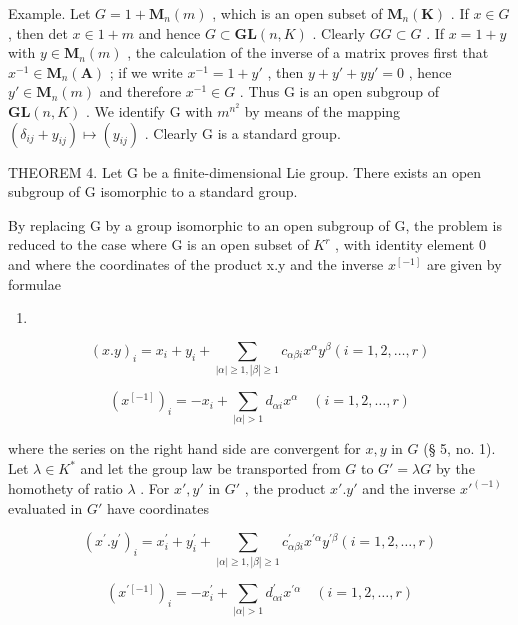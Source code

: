 Example. Let \(G = 1 + \mathbf{M}_{n}(m)\) , which is an open subset of \(\mathbf{M}_{n}(\mathbf{K})\) . If \(x \in G\) , then det \(x \in 1 + m\) and hence \(G \subset \mathbf{GL}(n, K)\) . Clearly \(GG \subset G\) . If \(x = 1 + y\) with \(y \in \mathbf{M}_{n}(m)\) , the calculation of the inverse of a matrix proves first that \(x^{-1} \in \mathbf{M}_{n}(\mathbf{A})\) ; if we write \(x^{-1} = 1 + y'\) , then \(y + y' + yy' = 0\) , hence \(y' \in \mathbf{M}_{n}(m)\) and therefore \(x^{-1} \in G\) . Thus G is an open subgroup of \(\mathbf{GL}(n, K)\) . We identify G with \(m^{n^2}\) by means of the mapping \((\delta_{ij} + y_{ij}) \mapsto (y_{ij})\) . Clearly G is a standard group.

THEOREM 4. Let G be a finite-dimensional Lie group. There exists an open subgroup of G isomorphic to a standard group.

By replacing G by a group isomorphic to an open subgroup of G, the problem is reduced to the case where G is an open subset of \(K^{r}\) , with identity element 0 and where the coordinates of the product x.y and the inverse \(x^{[-1]}\) are given by formulae

\begin{enumerate}
\def\labelenumi{(\arabic{enumi})}
\setcounter{enumi}{2}
\tightlist
\item
\end{enumerate}

\[
(x. y) _ {i} = x _ {i} + y _ {i} + \sum_ {| \alpha | \geqslant 1, | \beta | \geqslant 1} c _ {\alpha \beta i} x ^ {\alpha} y ^ {\beta} (i = 1, 2, \dots , r)\tag{3}
\]

\[
(x ^ {[ - 1 ]}) _ {i} = - x _ {i} + \sum_ {| \alpha | > 1} d _ {\alpha i} x ^ {\alpha} \quad (i = 1, 2, \dots , r)\tag{4}
\]

where the series on the right hand side are convergent for \(x, y\) in \(G\) (§ 5, no. 1). Let \(\lambda \in K^*\) and let the group law be transported from \(G\) to \(G' = \lambda G\) by the homothety of ratio \(\lambda\) . For \(x', y'\) in \(G'\) , the product \(x'.y'\) and the inverse \(x'^{(-1)}\) evaluated in \(G'\) have coordinates

\[
(x ^ {\prime}. y ^ {\prime}) _ {i} = x _ {i} ^ {\prime} + y _ {i} ^ {\prime} + \sum_ {| \alpha | \geqslant 1, | \beta | \geqslant 1} c _ {\alpha \beta i} ^ {\prime} x ^ {\prime \alpha} y ^ {\prime \beta} (i = 1, 2, \dots , r)
\]

\[
(x ^ {\prime [ - 1 ]}) _ {i} = - x _ {i} ^ {\prime} + \sum_ {| \alpha | > 1} d _ {\alpha i} ^ {\prime} x ^ {\prime \alpha} \quad (i = 1, 2, \dots , r)
\]

